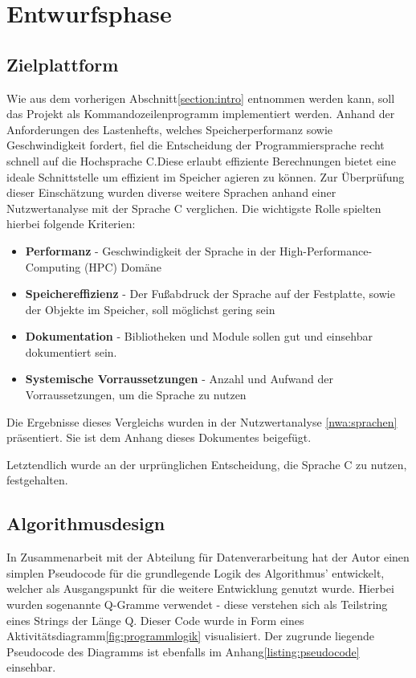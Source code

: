 \section{Entwurfsphase}


\subsection{Zielplattform}
Wie aus dem vorherigen Abschnitt\ref{section:intro} entnommen werden kann, soll das Projekt als Kommandozeilenprogramm
implementiert werden. Anhand der Anforderungen des Lastenhefts, welches Speicherperformanz sowie Geschwindigkeit fordert,
fiel die Entscheidung der Programmiersprache recht schnell auf die Hochsprache C.Diese erlaubt effiziente Berechnungen bietet eine ideale Schnittstelle um effizient im Speicher agieren zu können.
Zur Überprüfung dieser Einschätzung wurden diverse weitere Sprachen anhand einer
Nutzwertanalyse mit der Sprache C verglichen. Die wichtigste Rolle spielten hierbei folgende Kriterien:
\begin{itemize}
    \item \textbf{Performanz} - Geschwindigkeit der Sprache in der High-Performance-Computing (HPC) Domäne
    \item \textbf{Speichereffizienz} - Der Fußabdruck der Sprache auf der Festplatte, sowie der Objekte im Speicher, soll möglichst gering sein
    \item \textbf{Dokumentation} - Bibliotheken und Module sollen gut und einsehbar dokumentiert sein.
    \item \textbf{Systemische Vorraussetzungen} - Anzahl und Aufwand der Vorraussetzungen, um die Sprache zu nutzen
\end{itemize}

Die Ergebnisse dieses Vergleichs wurden in der Nutzwertanalyse \ref{nwa:sprachen} präsentiert.
Sie ist dem Anhang dieses Dokumentes beigefügt.\par
Letztendlich wurde an der urprünglichen Entscheidung, die Sprache C zu nutzen, festgehalten.

\subsection{Algorithmusdesign}
In Zusammenarbeit mit der Abteilung für Datenverarbeitung hat der Autor einen simplen
Pseudocode für die grundlegende Logik des Algorithmus' entwickelt, welcher als Ausgangspunkt
für die weitere Entwicklung genutzt wurde. Hierbei wurden sogenannte Q-Gramme verwendet - 
diese verstehen sich als Teilstring eines Strings der Länge Q. Dieser Code wurde in Form eines
Aktivitätsdiagramm\ref{fig:programmlogik} visualisiert. Der zugrunde liegende  Pseudocode des Diagramms ist ebenfalls im Anhang\ref{listing:pseudocode} einsehbar.



